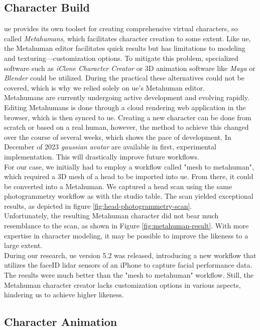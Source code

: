 \documentclass[
  a4paper,  %
  twoside,  %
  bibliography=totoc,
  headsepline,
  cleardoublepage=empty,
  parskip=half,
  draft=false
]{scrbook}
\begin{document}
\subsection*{Character Build}
\gls{ue} provides its own toolset for creating comprehensive virtual characters, so called \textit{Metahumans}, which facilitates character creation to some extent. Like \gls{ue}, the Metahuman editor facilitates quick results but has limitations to modeling and texturing—customization options. To mitigate this problem, specialized software such as \textit{iClone Character Creator} or 3D animation software like \textit{Maya} or \textit{Blender} could be utilized. During the practical these alternatives could not be covered, which is why we relied solely on \gls{ue}'s Metahuman editor. \\
Metahumans are currently undergoing active development and evolving rapidly. Editing Metahumans is done through a cloud rendering web application in the browser, which is then synced to \gls{ue}. Creating a new character can be done from scratch or based on a real human, however, the method to achieve this changed over the course of several weeks, which shows the pace of development. In December of 2023 \textit{gaussian avatar} are available in first, experimental implementation. This will drastically improve future workflows. \\
For our case, we initially had to employ a workflow called "mesh to metahuman", which required a 3D mesh of a head to be imported into \gls{ue}. From there, it could be converted into a Metahuman. We captured a head scan using the same photogrammetry workflow as with the studio table. The scan yielded exceptional results, as depicted in figure \ref{fig:head-photogrammetry-scan}. \\
Unfortunately, the resulting Metahuman character did not bear much resemblance to the scan, as shown in Figure \ref{fig:metahuman-result}. With more expertise in character modeling, it may be possible to improve the likeness to a large extent. \\
During our research, \gls{ue} version 5.2 was released, introducing a new workflow that utilizes the faceID lidar sensors of an iPhone to capture facial performance data. The results were much better than the "mesh to metahuman" workflow. Still, the Metahuman character creator lacks customization options in various aspects, hindering us to achieve higher likeness.

\subsection*{Character Animation}
\end{document}
